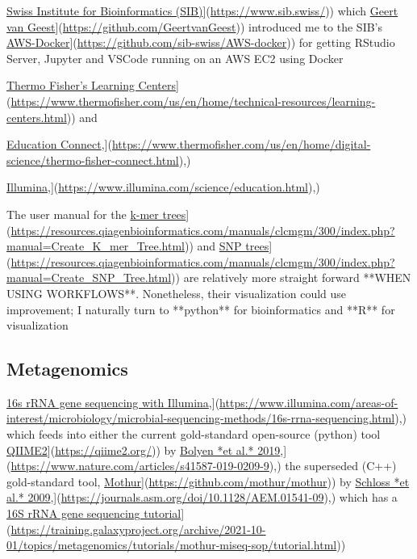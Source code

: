 \documentclass[
]{book}
\begin{document}
\href{\%5Bhttps://www.sib.swiss/}{Swiss Institute for Bioinformatics (SIB)}{]}(\url{https://www.sib.swiss/})) which \href{\%5Bhttps://github.com/GeertvanGeest}{Geert van Geest}{]}(\url{https://github.com/GeertvanGeest})) introduced me to the SIB's \href{\%5Bhttps://github.com/sib-swiss/AWS-docker}{AWS-Docker}{]}(\url{https://github.com/sib-swiss/AWS-docker})) for getting RStudio Server, Jupyter and VSCode running on an AWS EC2 using Docker

\href{\%5Bhttps://www.thermofisher.com/us/en/home/technical-resources/learning-centers.html}{Thermo Fisher's Learning Centers}{]}(\url{https://www.thermofisher.com/us/en/home/technical-resources/learning-centers.html})) and

\href{\%5Bhttps://www.thermofisher.com/us/en/home/digital-science/thermo-fisher-connect.html}{Education Connect},{]}(\url{https://www.thermofisher.com/us/en/home/digital-science/thermo-fisher-connect.html}),)

\href{\%5Bhttps://www.illumina.com/science/education.html}{Illumina},{]}(\url{https://www.illumina.com/science/education.html}),)

The user manual for the \href{\%5Bhttps://resources.qiagenbioinformatics.com/manuals/clcmgm/300/index.php?manual=Create_K_mer_Tree.html}{k-mer trees}{]}(\url{https://resources.qiagenbioinformatics.com/manuals/clcmgm/300/index.php?manual=Create_K_mer_Tree.html})) and \href{\%5Bhttps://resources.qiagenbioinformatics.com/manuals/clcmgm/300/index.php?manual=Create_SNP_Tree.html}{SNP trees}{]}(\url{https://resources.qiagenbioinformatics.com/manuals/clcmgm/300/index.php?manual=Create_SNP_Tree.html})) are relatively more straight forward **WHEN USING WORKFLOWS**. Nonetheless, their visualization could use improvement; I naturally turn to **python** for bioinformatics and **R** for visualization

\subsection{Metagenomics}\label{metagenomics}

\href{\%5Bhttps://www.illumina.com/areas-of-interest/microbiology/microbial-sequencing-methods/16s-rrna-sequencing.html}{16s rRNA gene sequencing with Illumina},{]}(\url{https://www.illumina.com/areas-of-interest/microbiology/microbial-sequencing-methods/16s-rrna-sequencing.html}),) which feeds into either the current gold-standard open-source (python) tool \href{\%5Bhttps://qiime2.org/}{QIIME2}{]}(\url{https://qiime2.org/})) by \href{\%5Bhttps://www.nature.com/articles/s41587-019-0209-9}{Bolyen *et al.* 2019},{]}(\url{https://www.nature.com/articles/s41587-019-0209-9}),) the superseded (C++) gold-standard tool, \href{\%5Bhttps://github.com/mothur/mothur}{Mothur}{]}(\url{https://github.com/mothur/mothur})) by \href{\%5Bhttps://journals.asm.org/doi/10.1128/AEM.01541-09}{Schloss *et al.* 2009},{]}(\url{https://journals.asm.org/doi/10.1128/AEM.01541-09}),) which has a \href{\%5Bhttps://training.galaxyproject.org/archive/2021-10-01/topics/metagenomics/tutorials/mothur-miseq-sop/tutorial.html}{16S rRNA gene sequencing tutorial}{]}(\url{https://training.galaxyproject.org/archive/2021-10-01/topics/metagenomics/tutorials/mothur-miseq-sop/tutorial.html}))
\end{document}

